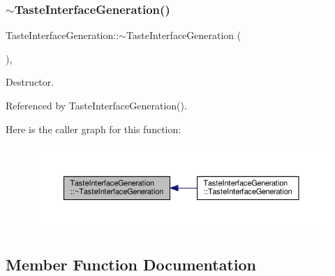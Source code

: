\subsubsection{\texorpdfstring{$\sim$\+Taste\+Interface\+Generation()}{~TasteInterfaceGeneration()}}
{\footnotesize\ttfamily Taste\+Interface\+Generation\+::$\sim$\+Taste\+Interface\+Generation (\begin{DoxyParamCaption}{ }\end{DoxyParamCaption})\hspace{0.3cm}{\ttfamily [override]}, {\ttfamily [default]}}



Destructor. 



Referenced by Taste\+Interface\+Generation().

Here is the caller graph for this function\+:
\nopagebreak
\begin{figure}[H]
\begin{center}
\leavevmode
\includegraphics[width=350pt]{dc/d30/classTasteInterfaceGeneration_a32597bb37a797ccd8b851f497bfd47b0_icgraph}
\end{center}
\end{figure}


\subsection{Member Function Documentation}
\mbox{\label{classTasteInterfaceGeneration_ac81f5d05e67e11e91d4a03e6437a9fc0}} 
